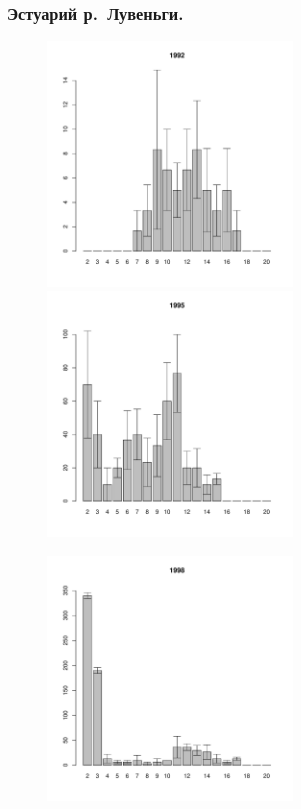 \documentclass[12pt, a4paper]{article}
\begin{document}
	\subsubsection{Эстуарий р.~Лувеньги.}





\begin{figure}[h]

\begin{multicols}{3}
\hfill
\includegraphics[width=65mm]{../White_Sea/Estuatiy_Luvenga/sizestr2_1992_.pdf}
\hfill
\includegraphics[width=65mm]{../White_Sea/Estuatiy_Luvenga/sizestr2_1995_.pdf}

\hfill
\includegraphics[width=65mm]{../White_Sea/Estuatiy_Luvenga/sizestr2_1998_.pdf}


\end{multicols}
\end{figure}
\end{document}
